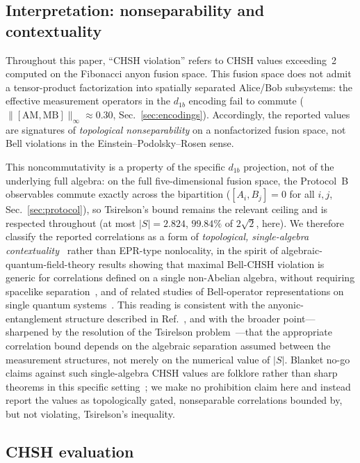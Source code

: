 \documentclass[aps,pra,twocolumn,superscriptaddress,longbibliography,floatfix,nofootinbib]{revtex4-2}
\begin{document}
\subsection{Interpretation: nonseparability and contextuality}
\label{fn:nonsep}

Throughout this paper, ``CHSH violation'' refers to CHSH values
exceeding~2 computed on the Fibonacci anyon fusion space. This
fusion space does not admit a tensor-product factorization into
spatially separated Alice/Bob subsystems: the effective measurement
operators in the $d_{1b}$ encoding fail to commute
($\|[\text{AM},\text{MB}]\|_\infty \approx 0.30$, Sec.~\ref{sec:encodings}).
Accordingly, the reported values are signatures of \emph{topological
nonseparability} on a nonfactorized fusion space, not Bell
violations in the Einstein--Podolsky--Rosen sense.

This noncommutativity is a property of the specific $d_{1b}$
projection, not of the underlying full algebra: on the full
five-dimensional fusion space, the Protocol~B observables commute
exactly across the bipartition ($[A_i,B_j]=0$ for all $i,j$,
Sec.~\ref{sec:protocol}), so Tsirelson's bound remains the relevant
ceiling and is respected throughout (at most $|S|=2.824$, $99.84\%$
of $2\sqrt{2}$, here). We therefore classify the reported
correlations as a form of \emph{topological, single-algebra
contextuality}~\cite{Chou2025} rather than EPR-type nonlocality, in
the spirit of algebraic-quantum-field-theory results showing that
maximal Bell-CHSH violation is generic for correlations defined on a
single non-Abelian algebra, without requiring spacelike
separation~\cite{SummersWerner1987}, and of related studies of
Bell-operator representations on single quantum
systems~\cite{GuimaraesRoditiSorella2024,DeFabritiisEtAl2023}. This
reading is consistent with the anyonic-entanglement structure
described in Ref.~\cite{BondersonKnappPatel2017}, and with the
broader point---sharpened by the resolution of the Tsirelson
problem~\cite{JiNatarajanVidickWrightYuen2020}---that the
appropriate correlation bound depends on the algebraic separation
assumed between the measurement structures, not merely on the
numerical value of $|S|$. Blanket no-go claims against such
single-algebra CHSH values are folklore rather than sharp theorems
in this specific setting~\cite{FanDeGaris2010}; we make no
prohibition claim here and instead report the values as
topologically gated, nonseparable correlations bounded by, but not
violating, Tsirelson's inequality.

\subsection{CHSH evaluation}
\end{document}
